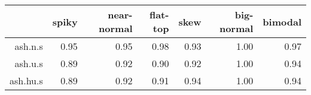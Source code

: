 \begin{tabular}{rrrrrrr}
  \toprule  & spiky & near-normal & flat-top & skew & big-normal & bimodal \\ 
  \midrule ash.n.s & 0.95 & 0.95 & 0.98 & 0.93 & 1.00 & 0.97 \\ 
  ash.u.s & 0.89 & 0.92 & 0.90 & 0.92 & 1.00 & 0.94 \\ 
  ash.hu.s & 0.89 & 0.92 & 0.91 & 0.94 & 1.00 & 0.94 \\ 
   \bottomrule \end{tabular}

